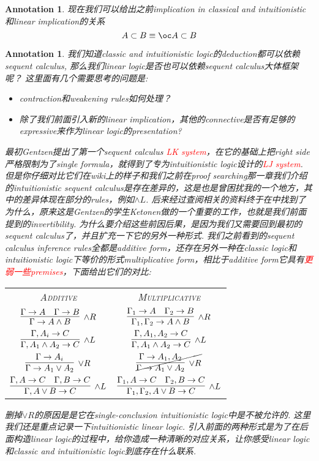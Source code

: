 \documentclass{article}
\theoremstyle{plain}
\newtheorem{annotation}[theorem]{Annotation}
\theoremstyle{nonumberplain}
\newcommand{\redt}[1]{\textcolor{red}{#1}}
\begin{document}
\begin{annotation}
\rm 现在我们可以给出之前implication in classical and intuitionistic和linear implication的关系
\[
A \subset B \equiv \oc A \subset B
\] 
\end{annotation}

\begin{annotation}
\rm 我们知道classic and intuitionistic logic的deduction都可以依赖sequent calculus, 那么我们linear logic是否也可以依赖sequent calculus大体框架呢？ 这里面有几个需要思考的问题是:
\begin{itemize}
	\item contraction和weakening rules如何处理？
	\item 除了我们前面引入新的linear implication，其他的connective是否有足够的expressive来作为linear logic的presentation?
\end{itemize} 

最初Gentzen提出了第一个sequent calculus \redt{LK system}，在它的基础上把right side严格限制为了single formula，就得到了专为intuitionistic logic设计的\redt{LJ system}. 但是你仔细对比它们在wiki上的样子和我们之前在proof searching那一章我们介绍的intuitionistic sequent calculus是存在差异的，这是也是曾困扰我的一个地方，其中的差异体现在部分的rules，例如$\wedge L$. 后来经过查阅相关的资料终于在\cite{proof-theory-development}中找到了为什么，原来这是Gentzen的学生Ketonen做的一个重要的工作，也就是我们前面提到的invertibility. 为什么要介绍这些前因后果，是因为我们又需要回到最初的sequent calculus了，并且扩充一下它的另外一种形式. 我们之前看到的sequent calculus inference rules全都是\emph{additive form}，还存在另外一种在classic logic和intuitionistic logic下等价的形式\emph{multiplicative form}，相比于additive form它具有\redt{更弱一些premises}，下面给出它们的对比:
\begin{center}
\setlength\tabcolsep{12pt}
\begin{tabular}{c|c}
\textsc{Additive} & \textsc{Multiplicative} \\[0.5em]
$\infer[\wedge R]{\Gamma \to A \wedge B}{\Gamma \to A & \Gamma \to B}$ & $\infer[\wedge R]{\Gamma_1,\Gamma_2 \to A \wedge B}{\Gamma_1 \to A & \Gamma_2 \to B}$  \\[0.5em]
$\infer[\wedge L]{\Gamma, A_1 \wedge A_2 \to C}{\Gamma, A_i \to C}$ & $\infer[\wedge L]{\Gamma, A_1 \wedge A_2 \to C}{\Gamma, A_1, A_2 \to C}$ \\[0.5em]
$\infer[\vee R]{\Gamma \to A_1 \vee A_2}{\Gamma \to A_i}$ & $\cancel{\infer[\vee R]{\Gamma \to A_1 \vee A_2}{\Gamma \to A_1, A_2}}$ \\[0.5em]
$\infer[\wedge L]{\Gamma, A \vee B \to C}{\Gamma ,A \to C & \Gamma ,B \to C}$ & $\infer[\wedge L]{\Gamma_1,\Gamma_2, A \vee B \to C}{\Gamma_1 ,A \to C & \Gamma_2 ,B \to C}$
\end{tabular}
\end{center}
删掉$\vee R$的原因是是它在single-conclusion intuitionistic logic中是不被允许的. 这里我们还是重点记录一下intuitionistic linear logic. 引入前面的两种形式是为了在后面构造linear logic的过程中，给你造成一种清晰的对应关系，让你感受linear logic和classic and intuitionistic logic到底存在什么联系. 


\end{annotation}
\end{document}
